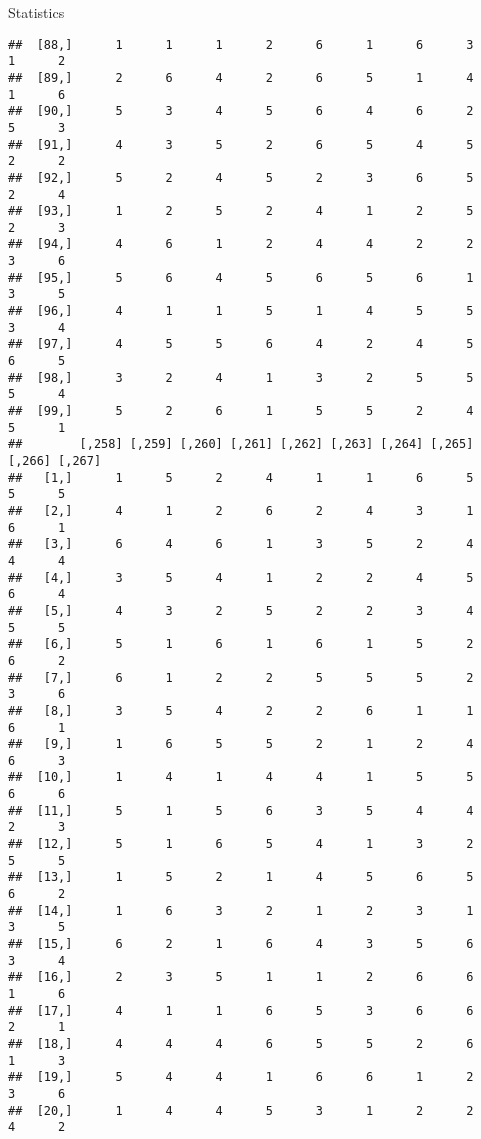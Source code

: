 \documentclass[
  ignorenonframetext,
]{beamer}
\begin{document}
\begin{frame}[fragile]{Statistics}
\begin{verbatim}
##  [88,]      1      1      1      2      6      1      6      3      1      2
##  [89,]      2      6      4      2      6      5      1      4      1      6
##  [90,]      5      3      4      5      6      4      6      2      5      3
##  [91,]      4      3      5      2      6      5      4      5      2      2
##  [92,]      5      2      4      5      2      3      6      5      2      4
##  [93,]      1      2      5      2      4      1      2      5      2      3
##  [94,]      4      6      1      2      4      4      2      2      3      6
##  [95,]      5      6      4      5      6      5      6      1      3      5
##  [96,]      4      1      1      5      1      4      5      5      3      4
##  [97,]      4      5      5      6      4      2      4      5      6      5
##  [98,]      3      2      4      1      3      2      5      5      5      4
##  [99,]      5      2      6      1      5      5      2      4      5      1
##        [,258] [,259] [,260] [,261] [,262] [,263] [,264] [,265] [,266] [,267]
##   [1,]      1      5      2      4      1      1      6      5      5      5
##   [2,]      4      1      2      6      2      4      3      1      6      1
##   [3,]      6      4      6      1      3      5      2      4      4      4
##   [4,]      3      5      4      1      2      2      4      5      6      4
##   [5,]      4      3      2      5      2      2      3      4      5      5
##   [6,]      5      1      6      1      6      1      5      2      6      2
##   [7,]      6      1      2      2      5      5      5      2      3      6
##   [8,]      3      5      4      2      2      6      1      1      6      1
##   [9,]      1      6      5      5      2      1      2      4      6      3
##  [10,]      1      4      1      4      4      1      5      5      6      6
##  [11,]      5      1      5      6      3      5      4      4      2      3
##  [12,]      5      1      6      5      4      1      3      2      5      5
##  [13,]      1      5      2      1      4      5      6      5      6      2
##  [14,]      1      6      3      2      1      2      3      1      3      5
##  [15,]      6      2      1      6      4      3      5      6      3      4
##  [16,]      2      3      5      1      1      2      6      6      1      6
##  [17,]      4      1      1      6      5      3      6      6      2      1
##  [18,]      4      4      4      6      5      5      2      6      1      3
##  [19,]      5      4      4      1      6      6      1      2      3      6
##  [20,]      1      4      4      5      3      1      2      2      4      2

\end{verbatim}
\end{frame}
\end{document}

